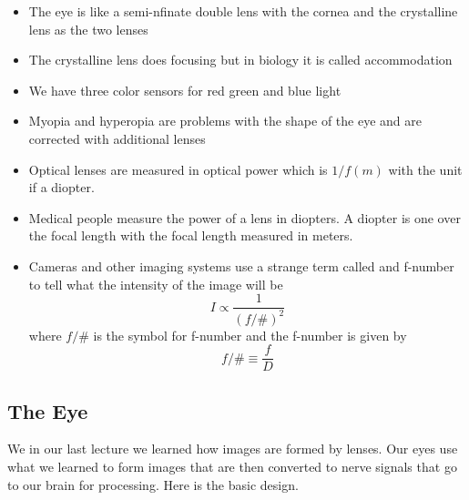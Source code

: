 \documentclass{article}
\begin{document}
\begin{itemize}
\item The eye is like a semi-nfinate double lens with the cornea and the
crystalline lens as the two lenses

\item The crystalline lens does focusing but in biology it is called
accommodation

\item We have three color sensors for red green and blue light

\item Myopia and hyperopia are problems with the shape of the eye and are
corrected with additional lenses

\item Optical lenses are measured in optical power which is $1/f\left(
m\right) $ with the unit if a diopter.

\item Medical people measure the power of a lens in diopters. A diopter is
one over the focal length with the focal length measured in meters.

\item Cameras and other imaging systems use a strange term called and
f-number to tell what the intensity of the image will be%
\[
I\propto \frac{1}{\left( f/\#\right) ^{2}}
\]%
where $f/\#$ is the symbol for f-number and the f-number is given by%
\[
f/\#\equiv \frac{f}{D}
\]
\end{itemize}

\subsection{The Eye}

We in our last lecture we learned how images are formed by lenses. Our eyes
use what we learned to form images that are then converted to nerve signals
that go to our brain for processing. Here is the basic design.

\end{document}
